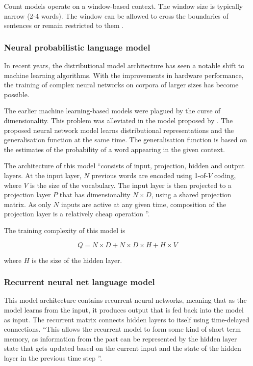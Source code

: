 \documentclass[14pt, a4paper]{extreport}
\begin{document}
Count models operate on a window-based context. The window size is typically narrow (2-4 words). The window can be allowed to cross the boundaries of sentences or remain restricted to them \parencite{baroni}.
      \subsubsection{Neural probabilistic language model}
In recent years, the distributional model architecture has seen a notable shift to machine learning algorithms. With the improvements in hardware performance, the training of complex neural networks on corpora of larger sizes has become possible. 

The earlier machine learning-based models were plagued by the curse of dimensionality. This problem was alleviated in the model proposed by \parencite{bengio}. The proposed neural network model learns distributional representations and the generalisation function at the same time. The generalisation function is based on the estimates of the probability of a word appearing in the given context.

The architecture of this model ``consists of input, projection, hidden and output layers. At the input layer, \(N\) previous words are encoded using 1-of-\(V\) coding, where \(V\) is the size of the vocabulary. The input layer is then projected to a projection layer \(P\) that has dimensionality \(N \times D\), using a shared projection matrix. As only \(N\) inputs are active at any given time, composition of the projection layer is a relatively cheap operation \parencite{mikolov}''.

The training complexity of this model is

\[Q = N \times D + N \times D \times H + H \times V\]

where \(H\) is the size of the hidden layer.
      \subsubsection{Recurrent neural net language model}
This model architecture contains recurrent neural networks, meaning that as the model learns from the input, it produces output that is fed back into the model as input. The recurrent matrix connects hidden layers to itself using time-delayed connections. ``This allows the recurrent model to form some kind of short term memory, as information from the past can be represented by the hidden layer state that gets updated based on the current input and the state of the hidden layer in the previous time step \parencite{mikolov}''.
\end{document}
